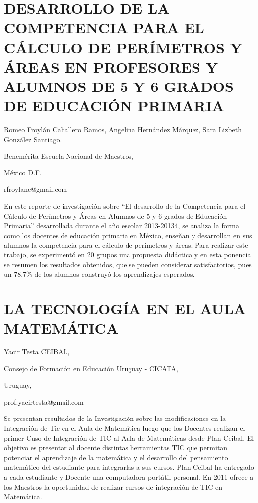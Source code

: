 \section{DESARROLLO DE LA COMPETENCIA PARA EL CÁLCULO DE PERÍMETROS Y ÁREAS
EN PROFESORES Y ALUMNOS DE 5\textdegree{} Y 6\textdegree{} GRADOS
DE EDUCACIÓN PRIMARIA}

\begin{datos}

Romeo Froylán Caballero Ramos, Angelina Hernández Márquez, Sara Lizbeth
González Santiago. 

Benemérita Escuela Nacional de Maestros,

México D.F. 

rfroylanc@gmail.com

\end{datos}

En este reporte de investigación sobre “El desarrollo de la Competencia
para el Cálculo de Perímetros y Áreas en Alumnos de 5\textdegree{}
y 6\textdegree{} grados de Educación Primaria” desarrollada durante
el año escolar 2013-20134, se analiza la forma como los docentes de
educación primaria en México, enseñan y desarrollan en sus alumnos
la competencia para el cálculo de perímetros y áreas. Para realizar
este trabajo, se experimentó en 20 grupos una propuesta didáctica
y en esta ponencia se resumen los resultados obtenidos, que se pueden
considerar satisfactorios, pues un 78.7\% de los alumnos construyó
los aprendizajes esperados.


\section{LA TECNOLOGÍA EN EL AULA MATEMÁTICA}

\begin{datos}

Yacir Testa CEIBAL,

Consejo de Formación en Educación Uruguay - CICATA,

Uruguay,

prof.yacirtesta@gmail.com

\end{datos}

Se presentan resultados de la Investigación sobre las modificaciones
en la Integración de Tic en el Aula de Matemática luego que los Docentes
realizan el primer Cuso de Integración de TIC al Aula de Matemáticas
desde Plan Ceibal. El objetivo es presentar al docente distintas herramientas
TIC que permitan potenciar el aprendizaje de la matemática y el desarrollo
del pensamiento matemático del estudiante para integrarlas a sus cursos.
Plan Ceibal ha entregado a cada estudiante y Docente una computadora
portátil personal. En 2011 ofrece a los Maestros la oportunidad de
realizar cursos de integración de TIC en Matemática. 


